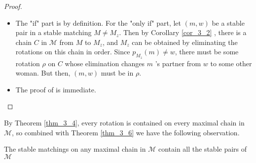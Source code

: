 \begin{proof}
    \begin{itemize}
        \item The "if" part is by definition. For the "only if" part, let $(m, w)$ be a stable pair in a stable matching $M \neq M_z$. Then by Corollary \ref{cor_3_2} , there is a chain $C$ in $\mathcal{M}$ from $M$ to $M_z$, and $M_z$ can be obtained by eliminating the rotations on this chain in order. Since $p_{M_z}(m) \neq w$, there must be some rotation $\rho$ on $C$ whose elimination changes $m$ 's partner from $w$ to some other woman. But then, $(m, w)$ must be in $\rho$.
        \item The proof of is immediate.
    \end{itemize}
\end{proof}

By Theorem \ref{thm_3_4}, every rotation is contained on every maximal chain in $\mathcal{M}$, so combined with Theorem \ref{thm_3_6} we have the following observation.

\begin{corollary}\label{cor_3_3}
The stable matchings on any maximal chain in $\mathcal{M}$ contain all the stable pairs of $\mathcal{M}$
\end{corollary}
